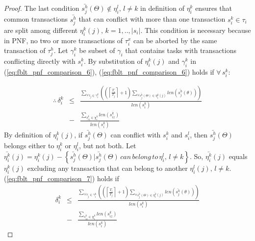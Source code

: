 \documentclass[conference,letterpaper]{IEEEtran}
\begin{document}
\begin{proof}
The last condition $\bar{s_{j}^{h}}(\Theta)\not\in\eta_{i}^{l},\, l\ne k$
in definition of $\eta_{i}^{k}$ ensures that common transactions
$\bar{s_{j}^{h}}$ that can conflict with more than one transaction
$s_{i}^{k}\in\tau_{i}$ are split among different $\eta_{i}^{k}(j),\, k=1,..,|s_{i}|$.
This condition is necessary because in PNF, no two or more transactions
of $\tau_{i}^{x}$ can be aborted by the same transaction of $\tau_{j}^{h}$.
Let $\gamma_{i}^{k}$ be subset of $\gamma_{i}$ that contains tasks
with transactions conflicting directly with $s_{i}^{k}$. By substitution
of $\eta_{i}^{k}(j)$ and $\gamma_{i}^{k}$ in (\ref{eq:fblt_pnf_comparison_6}),
(\ref{eq:fblt_pnf_comparison_6}) holds if $\forall\, s_{i}^{k}$:
%

%
\begin{eqnarray}
\therefore\,\delta_{i}^{k} & \le & \frac{\sum_{\forall\tau_{j}\in\gamma_{i}^{k}}\left(\left(\left\lceil \frac{T_{i}}{T_{j}}\right\rceil +1\right)\sum_{\forall\bar{s_{j}^{h}}(\Theta)\in\eta_{i}^{k}(j)}len\left(\bar{s_{j}^{h}}(\theta)\right)\right)}{len(s_i^k)}\nonumber\\
& -& \frac{\sum_{s_{iz}^{k}\in\chi_{i}^{k}}len(s_{iz}^{k})}{len(s_{i}^{k})}\label{eq:fblt_pnf_comparison_7}
\end{eqnarray}
By definition of $\eta_{i}^{k}(j)$, if $\bar{s_{j}^{h}}(\Theta)$
can conflict with $s_{i}^{k}$ and $s_{i}^{l}$, then $\bar{s_{j}^{h}}(\Theta)$
belongs either to $\eta_{i}^{k}$ or $\eta_{i}^{l}$, but not both.
Let $\bar{\eta_{i}^{k}}(j)=\eta_{i}^{k}(j)-\left\{\bar{s_{j}^{h}}(\Theta)|\bar{s_{j}^{h}}(\Theta)\, can\, belong\, to\,\eta_{i}^{l},\,l\neq k\right\}$.
So, $\bar{\eta_{i}^{k}}(j)$ equals $\eta_{i}^{k}(j)$ excluding any
transaction that can belong to another $\eta_{i}^{l}(j),\, l\neq k$.
(\ref{eq:fblt_pnf_comparison_7}) holds if 
\begin{eqnarray}
\delta_{i}^{k} & \le & \frac{\sum_{\forall\tau_{j}\in\gamma_{i}^{k}}\left(\left(\left\lceil \frac{T_{i}}{T_{j}}\right\rceil +1\right)\sum_{\forall\bar{s_{j}^{h}}(\Theta)\in\bar{\eta_{i}^{k}}(j)}len\left(\bar{s_{j}^{h}}(\theta)\right)\right)}{len(s_i^k)}\nonumber\\
& - & \frac{\sum_{s_{iz}^{k}\in\chi_{i}^{k}}len(s_{iz}^{k})}{len(s_{i}^{k})}\label{eq:fblt_pnf_comparison_8}

\end{eqnarray}
\end{proof}
\end{document}
